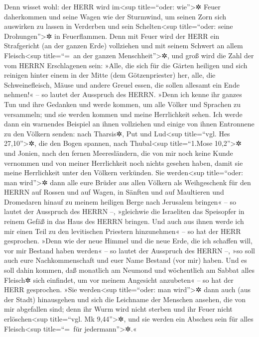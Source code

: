 Denn wisset wohl: der HERR wird im\textless sup
title=``oder: wie''\textgreater✲ Feuer daherkommen und seine Wagen wie
der Sturmwind, um seinen Zorn sich auswirken zu lassen in Verderben und
sein Schelten\textless sup title=``oder: seine Drohungen''\textgreater✲
in Feuerflammen. Denn mit Feuer wird der HERR ein
Strafgericht (an der ganzen Erde) vollziehen und mit seinem Schwert an
allem Fleisch\textless sup title=``=~an der ganzen
Menschheit''\textgreater✲, und groß wird die Zahl der vom HERRN
Erschlagenen sein: »Alle, die sich für die Gärten
heiligen und sich reinigen hinter einem in der Mitte (dem
Götzenpriester) her, alle, die Schweinefleisch, Mäuse und andere Greuel
essen, die sollen allesamt ein Ende nehmen!« -- so lautet der Ausspruch
des HERRN. »Denn ich kenne ihr ganzes Tun und ihre
Gedanken und werde kommen, um alle Völker und Sprachen zu versammeln;
und sie werden kommen und meine Herrlichkeit sehen. Ich
werde dann ein warnendes Beispiel an ihnen vollziehen und einige von
ihnen Entronnene zu den Völkern senden: nach Tharsis✲, Put und
Lud\textless sup title=``vgl. Hes 27,10''\textgreater✲, die den Bogen
spannen, nach Thubal\textless sup title=``1.Mose 10,2''\textgreater✲ und
Jonien, nach den fernen Meeresländern, die von mir noch keine Kunde
vernommen und von meiner Herrlichkeit noch nichts gesehen haben, damit
sie meine Herrlichkeit unter den Völkern verkünden. Sie
werden\textless sup title=``oder: man wird''\textgreater✲ dann alle eure
Brüder aus allen Völkern als Weihgeschenk für den HERRN auf Rossen und
auf Wagen, in Sänften und auf Maultieren und Dromedaren hinauf zu meinem
heiligen Berge nach Jerusalem bringen« -- so lautet der Ausspruch des
HERRN --, »gleichwie die Israeliten das Speisopfer in reinem Gefäß in
das Haus des HERRN bringen. Und auch aus ihnen werde ich
mir einen Teil zu den levitischen Priestern hinzunehmen« -- so hat der
HERR gesprochen. »Denn wie der neue Himmel und die neue
Erde, die ich schaffen will, vor mir Bestand haben werden« -- so lautet
der Ausspruch des HERRN --, »so soll auch eure Nachkommenschaft und euer
Name Bestand (vor mir) haben. Und es soll dahin kommen,
daß monatlich am Neumond und wöchentlich am Sabbat alles Fleisch✲ sich
einfindet, um vor meinem Angesicht anzubeten« -- so hat der HERR
gesprochen. »Sie werden\textless sup title=``oder: man
wird''\textgreater✲ dann auch (aus der Stadt) hinausgehen und sich die
Leichname der Menschen ansehen, die von mir abgefallen sind; denn ihr
Wurm wird nicht sterben und ihr Feuer nicht erlöschen\textless sup
title=``vgl. Mk 9,44''\textgreater✲, und sie werden ein Abscheu sein für
alles Fleisch\textless sup title=``=~für jedermann''\textgreater✲.«
